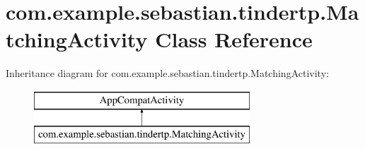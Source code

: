 \hypertarget{classcom_1_1example_1_1sebastian_1_1tindertp_1_1MatchingActivity}{}\section{com.\+example.\+sebastian.\+tindertp.\+Matching\+Activity Class Reference}
\label{classcom_1_1example_1_1sebastian_1_1tindertp_1_1MatchingActivity}
Inheritance diagram for com.\+example.\+sebastian.\+tindertp.\+Matching\+Activity\+:\begin{figure}[H]
\begin{center}
\leavevmode
\includegraphics[height=2.000000cm]{classcom_1_1example_1_1sebastian_1_1tindertp_1_1MatchingActivity}
\end{center}
\end{figure}
